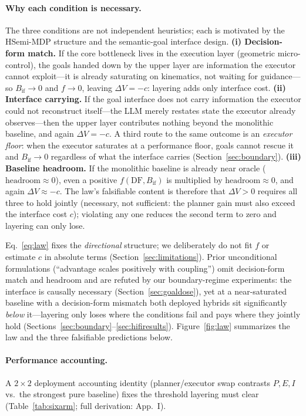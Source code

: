 \documentclass[sigconf,anonymous]{aamas}
\newcommand{\sapp}[1]{App.~#1}
\newcommand{\Bif}{B_{\mathrm{if}}}
\newcommand{\headroom}{\mathrm{headroom}}
\begin{document}
\paragraph{Why each condition is necessary.}
The three conditions are not independent heuristics; each is motivated by the HSemi-MDP structure and the semantic-goal interface design. \textbf{(i) Decision-form match.} If the core bottleneck lives in the execution layer (geometric micro-control), the goals handed down by the upper layer are information the executor cannot exploit---it is already saturating on kinematics, not waiting for guidance---so $\Bif \to 0$ and $f \to 0$, leaving $\Delta V = -c$: layering adds only interface cost. \textbf{(ii) Interface carrying.} If the goal interface does not carry information the executor could not reconstruct itself---the LLM merely restates state the executor already observes---then the upper layer contributes nothing beyond the monolithic baseline, and again $\Delta V = -c$. A third route to the same outcome is an \emph{executor floor}: when the executor saturates at a performance floor, goals cannot rescue it and $\Bif \to 0$ regardless of what the interface carries (Section~\ref{sec:boundary}). \textbf{(iii) Baseline headroom.} If the monolithic baseline is already near oracle ($\headroom \approx 0$), even a positive $f(\mathrm{DF},\Bif)$ is multiplied by $\headroom \approx 0$, and again $\Delta V \approx -c$. The law's falsifiable content is therefore that $\Delta V > 0$ requires all three to hold jointly (necessary, not sufficient: the planner gain must also exceed the interface cost $c$); violating any one reduces the second term to zero and layering can only lose.

Eq.~\ref{eq:law} fixes the \emph{directional} structure; we deliberately do not fit $f$ or estimate $c$ in absolute terms (Section~\ref{sec:limitations}). Prior unconditional formulations (``advantage scales positively with coupling'') omit decision-form match and headroom and are refuted by our boundary-regime experiments: the interface is causally necessary (Section~\ref{sec:goaldose}), yet at a near-saturated baseline with a decision-form mismatch both deployed hybrids sit significantly \emph{below} it---layering only loses where the conditions fail and pays where they jointly hold (Sections~\ref{sec:boundary}--\ref{sec:hifiresults}). Figure~\ref{fig:law} summarizes the law and the three falsifiable predictions below.

\paragraph{Performance accounting.}
A $2\times2$ deployment accounting identity (planner/executor swap contrasts $P,E,I$ vs.\ the strongest pure baseline) fixes the threshold layering must clear (Table~\ref{tab:sixarm}; full derivation: \sapp{I}).
\end{document}
